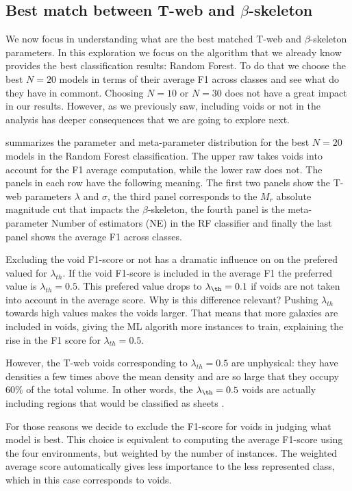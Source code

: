 \documentclass[usenatbib]{mnras}
\begin{document}
\subsection{Best match between T-web and $\beta$-skeleton}

We now focus in understanding what are the best matched T-web and
$\beta$-skeleton parameters.
In this exploration we focus on the algorithm that we already know
provides the best classification results: Random Forest. 
To do that we choose the best $N=20$ models in terms of their average F1 across
classes and see what do they have in commont.
Choosing $N=10$ or $N=30$ does not have a great impact in our
results. 
However, as we previously saw, including voids or not in the analysis
has deeper consequences that we are going to explore next.

\label{fig:features_score} summarizes the parameter and meta-parameter
distribution for the best $N=20$ models in the Random Forest
classification.
The upper raw takes voids into account for the F1 average computation,
while the lower raw does not.
The panels in each row have the following meaning.
The first two panels show the T-web parameters
$\lambda$ and $\sigma$, the third panel corresponds to the $M_r$
absolute magnitude cut that impacts the $\beta$-skeleton, the fourth
panel is the meta-parameter Number of estimators (NE) in the RF
classifier and finally the last panel shows the average F1 across
classes. 

Excluding the void F1-score or not has a dramatic influence on
on the prefered valued for $\lambda_{th}$. 
If the void F1-score is included in the average F1 the preferred value is
$\lambda_{th}=0.5$. 
This prefered value drops to $\lambda_{\th}=0.1$ if voids are not taken into
account in the average score.
Why is this difference relevant?
Pushing $\lambda_{th}$ towards high values makes the voids larger.
That means that more galaxies are included in voids, giving the ML
algorith more instances to train, explaining the rise in the F1 score
for $\lambda_{th}=0.5$.


However, the T-web voids corresponding to $\lambda_{th}=0.5$ are 
unphysical: they have densities a few times above the mean
density and are so large that they occupy $60\%$ of the total volume.
In other words, the $\lambda_{\th}=0.5$ voids are actually including
regions that would be classified as sheets
\citep{2015MNRAS.453..497B,Forero-Romero2009}. 


For those reasons we decide to exclude the F1-score for voids in
judging what model is best.
This choice is equivalent to computing the average F1-score using the
four environments, but weighted by the number of instances. 
The weighted average score automatically gives less importance to the
less represented class, which in this case corresponds to voids.
\end{document}
